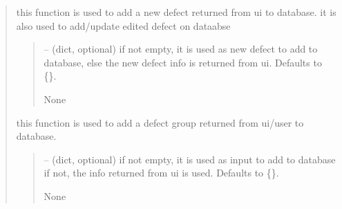 \documentclass[letterpaper,10pt,english]{sphinxmanual}
\begin{document}
\begin{quote}
\begin{savenotes}
\begin{fulllineitems}
\begin{savenotes}\begin{fulllineitems}
\label{\detokenize{setting/setting_api:oxin.setting_api.API.add_defect}}
\pysigstartsignatures
{}
\pysigstopsignatures
\sphinxAtStartPar
this function is used to add a new defect returned from ui to database.
it is also used to add/update edited defect on dataabse
\begin{quote}\begin{description}
\sphinxAtStartPar
{} – (dict, optional) if not empty, it is used as new defect to add to database,
else the new defect info is returned from ui. Defaults to \{\}.

\sphinxAtStartPar
None

\end{description}\end{quote}

\end{fulllineitems}\end{savenotes}


\begin{savenotes}\begin{fulllineitems}
\label{\detokenize{setting/setting_api:oxin.setting_api.API.add_defect_group}}
\pysigstartsignatures
{}
\pysigstopsignatures
\sphinxAtStartPar
this function is used to add a defect group returned from ui/user to database.
\begin{quote}\begin{description}
\sphinxAtStartPar
{} – (dict, optional) if not empty, it is used as input to add to database
if not, the info returned from ui is used. Defaults to \{\}.

\sphinxAtStartPar
None

\end{description}\end{quote}


\end{fulllineitems}
\end{savenotes}
\end{fulllineitems}
\end{savenotes}
\end{quote}
\end{document}
